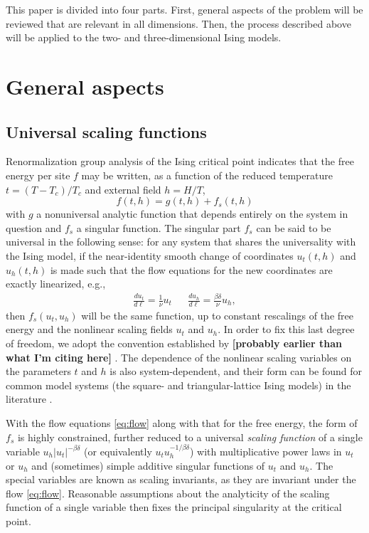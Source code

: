 \documentclass[
  aps,
  prb,
  reprint,
  longbibliography,
  floatfix
]{revtex4-2}
\begin{document}
This paper is divided into four parts. First, general aspects of the problem
will be reviewed that are relevant in all dimensions. Then, the process
described above will be applied to the two- and three-dimensional Ising models.

\section{General aspects}

\subsection{Universal scaling functions}

Renormalization group analysis of the Ising critical point indicates that the free energy per site $f$ may be written, as a function of the reduced temperature $t=(T-T_c)/T_c$ and external field $h=H/T$,
\begin{equation}
  f(t,h)=g(t,h)+f_s(t,h)
\end{equation}
with $g$ a nonuniversal analytic function that depends entirely on the system
in question and $f_s$ a singular function. The singular part $f_s$ can be said
to be universal in the following sense: for any system that shares the
universality with the Ising model, if the near-identity smooth change of coordinates
$u_t(t, h)$ and $u_h(t,h)$ is made such that the flow equations for the new
coordinates are exactly linearized, e.g.,
\begin{align} \label{eq:flow}
  \frac{du_t}{d\ell}=\frac1\nu u_t
  &&
  \frac{du_h}{d\ell}=\frac{\beta\delta}\nu u_h,
\end{align}
then $f_s(u_t, u_h)$ will be the same function, up to constant rescalings of
the free energy and the nonlinear scaling fields $u_t$ and $u_h$. In order to
fix this last degree of freedom, we adopt the convention established by
\textbf{[probably earlier than what I'm citing here]}
\cite{Fonseca_2003_Ising}. The dependence of the nonlinear scaling variables on
the parameters $t$ and $h$ is also system-dependent, and their form can be
found for common model systems (the square- and triangular-lattice Ising
models) in the literature \cite{Clement_2019_Respect}.

With the flow equations \eqref{eq:flow} along with that for the free energy,
the form of $f_s$ is highly constrained, further reduced to a universal
\emph{scaling function} of a single variable $u_h|u_t|^{-\beta\delta}$ (or equivalently
$u_tu_h^{-1/\beta\delta}$) with multiplicative power laws in $u_t$ or $u_h$ and
(sometimes) simple additive singular functions of $u_t$ and $u_h$. The special
variables are known as scaling invariants, as they are invariant under the flow
\eqref{eq:flow}. Reasonable assumptions about the analyticity of the scaling
function of a single variable then fixes the principal singularity at the
critical point.
\end{document}
